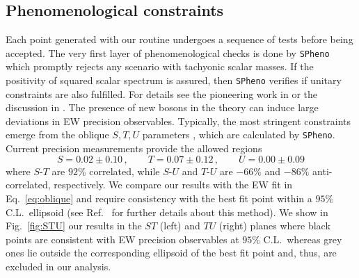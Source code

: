 \documentclass[a4paper,11pt]{article}
\renewcommand{\[}{\left[}
\renewcommand{\]}{\right]}
\begin{document}
\subsection{Phenomenological constraints}

Each point generated with our routine undergoes a sequence of tests before being accepted. The very first layer of phenomenological checks is done by \texttt{SPheno} which promptly rejects any scenario with tachyonic scalar masses. If the positivity of squared scalar spectrum is assured, then \texttt{SPheno} verifies if unitary constraints are also fulfilled. For details see the pioneering work in \cite{Lee:1977eg} or the discussion in \cite{Coimbra:2013qq}. The presence of new bosons in the theory can induce large deviations in EW precision observables. Typically, the most stringent constraints emerge from the oblique $S,T,U$ parameters \cite{Kennedy:1988sn,Peskin:1990zt,Maksymyk:1993zm}, which are calculated by \texttt{SPheno}. Current precision measurements \cite{Tanabashi:2018oca} provide the allowed regions 
\begin{equation}
	S = 0.02 \pm 0.10\,, \qquad T = 0.07 \pm 0.12\,, \qquad U = 0.00 \pm 0.09
	\label{eq:oblique}
\end{equation}
where $S$-$T$ are $92\%$ correlated, while $S$-$U$ and $T$-$U$ are $-66\%$ and $-86\%$ anti-correlated, respectively. We compare our results with the EW fit in Eq.~\eqref{eq:oblique} and require consistency with the best fit point within a $95\%$ C.L.~ellipsoid (see Ref.~\cite{Costa:2014qga} for further details about this method). We show in Fig.~\ref{fig:STU} our results in the $ST$ (left) and $TU$ (right) planes where black points are consistent with EW precision observables at $95\%$ C.L.~whereas grey ones lie outside the corresponding ellipsoid of the best fit point and, thus, are excluded in our analysis. 
\end{document}
